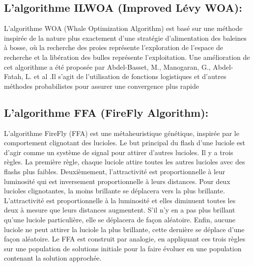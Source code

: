 \documentclass[class=report, crop=false]{standalone}
\begin{document}
        \subsection{L’algorithme ILWOA (Improved Lévy WOA): }
        L’algorithme WOA (Whale Optimization Algorithm) \cite{mirjalili2016whale} est basé sur une méthode inspirée de la nature plus exactement d’une stratégie d’alimentation des baleines à bosse, où la recherche des proies représente l’exploration de l’espace de recherche et la libération des bulles représente l’exploitation.
Une amélioration de cet algorithme a été proposée par Abdel-Basset, M., Manogaran, G., Abdel-Fatah, L. et al \cite{abdel2018improved}.Il s’agit de l’utilisation de fonctions logistiques et d’autres méthodes probabilistes pour assurer une convergence plus rapide
        \subsection{L’algorithme FFA (FireFly Algorithm): }
        L'algorithme FireFly (FFA) \cite{yesodha2015study} est une métaheuristique génétique, inspirée par le comportement clignotant des lucioles. Le but principal du flash d'une luciole est d'agir comme un système de signal pour attirer d'autres lucioles. Il y a trois règles. La première règle, chaque luciole attire toutes les autres lucioles avec des flashs plus faibles. Deuxièmement, l'attractivité est proportionnelle à leur luminosité qui est inversement proportionnelle à leurs distances. Pour deux lucioles clignotantes, la moins brillante se déplacera vers la plus brillante. L'attractivité est proportionnelle à la luminosité et elles diminuent toutes les deux à mesure que leurs distances augmentent. S'il n'y en a pas plus brillant qu'une luciole particulière, elle se déplacera de façon aléatoire. Enfin, aucune luciole ne peut attirer la luciole la plus brillante, cette dernière se déplace d’une façon aléatoire. Le FFA est construit par analogie, en appliquant ces trois règles sur une population de solutions initiale pour la faire évoluer en une population contenant la solution approchée.
\end{document}
